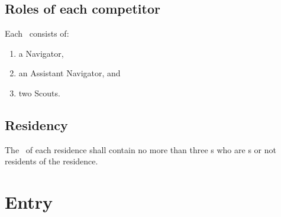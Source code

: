 \documentclass[12pt]{report}
\begin{document}
  \section{Roles of each competitor}
  \begin{fenumerate}
  \item Each \team\ consists of:
  \begin{enumerate}
    \item a Navigator,
    \item an Assistant Navigator, and
    \item two Scouts.
  \end{enumerate}
  \end{fenumerate}
  \section{Residency}
  \begin{fenumerate} \item
  The \squad\ of each residence shall contain no more than three \competitor s who are \exresident s or not residents of the residence.
  \end{fenumerate}

  \chapter{Entry}
\end{document}
